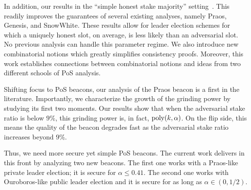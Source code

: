 In addition, our results in the ``simple honest stake majority'' setting~\cite{Multihonest}. 
This readily improves the guarantees of several existing analyses, 
namely Praos, Genesis, and SnowWhite. 
These results allow for leader election schemes 
for which a uniquely honest slot, on average, is less likely than 
an adversarial slot. 
No previous analysis can handle this parameter regime.
We also introduce new combinatorial notions which 
greatly simplifies consistency proofs.
Moreover, this work establishes connections between 
combinatorial notions and ideas from two 
different schools of PoS analysis.

Shifting focus to PoS beacons, 
our analysis of the Praos beacon is a first in the literature.
Importantly, we characterize the growth of the grinding power 
by studying its first two moments. 
Our results show that when the adversarial stake ratio is below $9\%$, 
this grinding power is, in fact, $\mathrm{poly}(k, \alpha)$. 
On the flip side, this means the quality of the beacon degrades fast 
as the adversarial stake ratio increases beyond $9\%$. 

Thus, we need more secure yet simple PoS beacons. 
The current work delivers in this front by 
analyzing two new beacons. 
The first one works with a Praos-like private leader election; 
it is secure for $\alpha \leq 0.41$. 
The second one works with Ouroboros-like public leader election 
and it is secure for as long as $\alpha \in (0, 1/2)$. 


